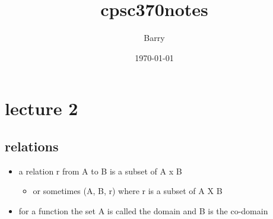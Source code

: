 \documentclass[11pt]{article}
\author{Barry }
\date{\today}
\title{cpsc370notes}
\begin{document}
\maketitle
\tableofcontents

\section{lecture 2}
\label{sec-1}
\subsection{relations}
\label{sec-1-1}
\begin{itemize}
\item a relation r from A to B is a subset of A x B
\begin{itemize}
\item or sometimes (A, B, r) where r is a subset of A X B
\end{itemize}
\item for a function the set A is called the domain and B is the co-domain
\end{itemize}
\end{document}
